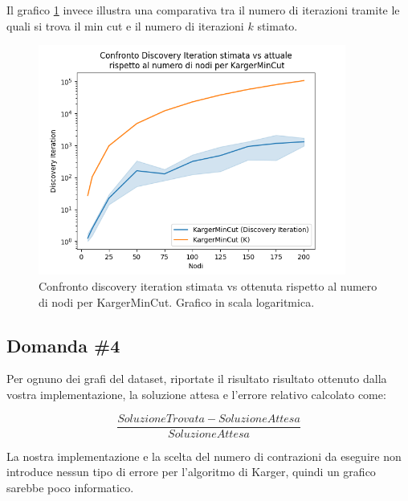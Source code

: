 \noindent Il grafico \ref{fig:karger-discovery-vs-estimated-k-chart} invece
illustra una comparativa tra il numero di iterazioni tramite le quali
si trova il min cut e il numero di iterazioni $k$ stimato.

\begin{figure}[!ht]
    \centering

    \includegraphics[width=0.9\textwidth]{./images/Confronto_Discovery_Iteration_stimata_vs_attuale__rispetto_al_numero_di_nodi_per_KargerMinCut.png}

    \caption{Confronto discovery iteration stimata vs ottenuta rispetto al numero di nodi per KargerMinCut. Grafico in scala logaritmica.}
    \label{fig:karger-discovery-vs-estimated-k-chart}
\end{figure}

\subsection{Domanda \#4}
\label{sec:question-4}

\begin{displayquote}
Per ognuno dei grafi del dataset, riportate il risultato risultato
ottenuto dalla vostra implementazione, la soluzione attesa e l'errore
relativo calcolato come:

\begin{equation*}
    \frac{SoluzioneTrovata - SoluzioneAttesa}{SoluzioneAttesa}
\end{equation*}

\end{displayquote}

\noindent La nostra implementazione e la scelta del numero di
contrazioni da eseguire non introduce nessun tipo di errore per
l'algoritmo di Karger, quindi un grafico sarebbe poco informatico.\\

